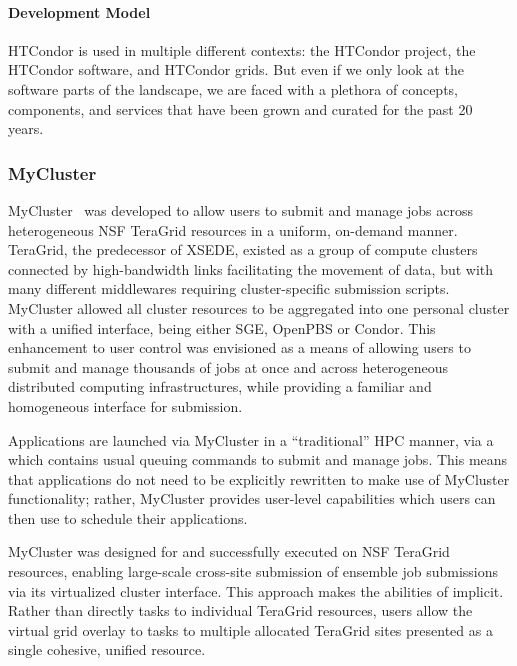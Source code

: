 \documentclass{sig-alternate}
\begin{document}
\paragraph{Development Model}

HTCondor is used in multiple different contexts: the HTCondor project, the
HTCondor software, and HTCondor grids. But even if we only look at the software
parts of the landscape, we are faced with a plethora of concepts, components,
and services that have been grown and curated for the past 20 years.

%
%
\subsubsection{MyCluster}
\label{sec:mycluster}

MyCluster~\cite{1652061} was developed to allow users to submit and manage jobs
across heterogeneous NSF TeraGrid resources in a uniform, on-demand manner.
TeraGrid, the predecessor of XSEDE, existed as a group of compute clusters
connected by high-bandwidth links facilitating the movement of data, but with
many different middlewares requiring cluster-specific submission scripts.
MyCluster allowed all cluster resources to be aggregated into one personal
cluster with a unified interface, being either SGE, OpenPBS or Condor. This
enhancement to user control was envisioned as a means of allowing users to
submit and manage thousands of jobs at once and across heterogeneous
distributed computing infrastructures, while providing a familiar and
homogeneous interface for submission.

Applications are launched via MyCluster in a ``traditional'' HPC manner, via a
 which contains usual queuing commands to submit
and manage jobs. This means that applications do not need to be explicitly
rewritten to make use of MyCluster functionality; rather, MyCluster provides
user-level \pilot capabilities which users can then use to schedule their
applications.

MyCluster was designed for and successfully executed on NSF TeraGrid resources,
enabling large-scale cross-site submission of ensemble job submissions via its
virtualized cluster interface. This approach makes the  abilities of \pilot implicit. Rather than directly 
tasks to individual TeraGrid resources, users allow the virtual grid overlay to
 tasks to multiple allocated TeraGrid sites presented as a
single cohesive, unified resource.
\end{document}
